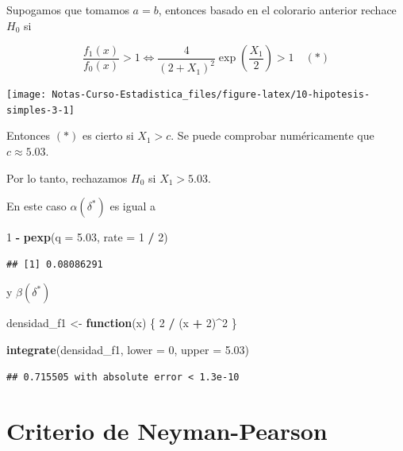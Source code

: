 \documentclass[
  12pt,
]{book}
\newenvironment{Shaded}{\begin{snugshade}}{\end{snugshade}}
\newcommand{\ControlFlowTok}[1]{\textcolor[rgb]{0.13,0.29,0.53}{\textbf{#1}}}
\newcommand{\DataTypeTok}[1]{\textcolor[rgb]{0.13,0.29,0.53}{#1}}
\newcommand{\DecValTok}[1]{\textcolor[rgb]{0.00,0.00,0.81}{#1}}
\newcommand{\FloatTok}[1]{\textcolor[rgb]{0.00,0.00,0.81}{#1}}
\newcommand{\KeywordTok}[1]{\textcolor[rgb]{0.13,0.29,0.53}{\textbf{#1}}}
\newcommand{\NormalTok}[1]{#1}
\newcommand{\OperatorTok}[1]{\textcolor[rgb]{0.81,0.36,0.00}{\textbf{#1}}}
\newcommand{\StringTok}[1]{\textcolor[rgb]{0.31,0.60,0.02}{#1}}
\begin{document}
Supogamos que tomamos \(a=b\), entonces basado en el colorario anterior rechace
\(H_0\) si

\[\dfrac{f_1(x)}{f_0(x)}>1\Leftrightarrow
\dfrac 4{(2+X_1)^2}\exp\left(\dfrac{X_1}2\right)>1\quad(*)\]

\begin{center}\texttt{[image: Notas-Curso-Estadistica\_files/figure-latex/10-hipotesis-simples-3-1]} \end{center}

Entonces \((*)\) es cierto si \(X_1>c\). Se puede comprobar numéricamente que \(c\approx5.03\).

Por lo tanto, rechazamos \(H_0\) si \(X_1>5.03\).

En este caso \(\alpha(\delta^*)\) es igual a

\begin{Shaded}
\begin{Highlighting}[]
\DecValTok{1} \OperatorTok{{-}}\StringTok{ }\KeywordTok{pexp}\NormalTok{(}\DataTypeTok{q =} \FloatTok{5.03}\NormalTok{, }\DataTypeTok{rate =} \DecValTok{1} \OperatorTok{/}\StringTok{ }\DecValTok{2}\NormalTok{)}
\end{Highlighting}
\end{Shaded}

\begin{verbatim}
## [1] 0.08086291
\end{verbatim}

y \(\beta(\delta^*)\)

\begin{Shaded}
\begin{Highlighting}[]
\NormalTok{densidad\_f1 \textless{}{-}}\StringTok{ }\ControlFlowTok{function}\NormalTok{(x) \{}
  \DecValTok{2} \OperatorTok{/}\StringTok{ }\NormalTok{(x }\OperatorTok{+}\StringTok{ }\DecValTok{2}\NormalTok{)}\OperatorTok{\^{}}\DecValTok{2}
\NormalTok{\}}

\KeywordTok{integrate}\NormalTok{(densidad\_f1, }\DataTypeTok{lower =} \DecValTok{0}\NormalTok{, }\DataTypeTok{upper =} \FloatTok{5.03}\NormalTok{)}
\end{Highlighting}
\end{Shaded}

\begin{verbatim}
## 0.715505 with absolute error < 1.3e-10
\end{verbatim}

\hypertarget{criterio-de-neyman-pearson}{%
\section{Criterio de Neyman-Pearson}\label{criterio-de-neyman-pearson}}
\end{document}
